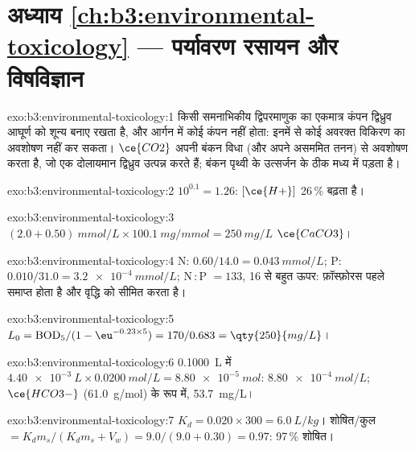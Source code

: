 \section*{अध्याय \ref{ch:b3:environmental-toxicology} --- पर्यावरण रसायन और विषविज्ञान}

\begin{solution}{exo:b3:environmental-toxicology:1}
किसी समनाभिकीय द्विपरमाणुक का एकमात्र कंपन द्विध्रुव आघूर्ण को शून्य बनाए रखता है,
और आर्गन में कोई कंपन नहीं होता: इनमें से कोई अवरक्त विकिरण का अवशोषण नहीं कर सकता। $\ce{CO2}$ अपनी
बंकन विधा (और अपने असममित तनन) से अवशोषण करता है, जो एक दोलायमान
द्विध्रुव उत्पन्न करते हैं; बंकन पृथ्वी के उत्सर्जन के ठीक मध्य में पड़ता है।
\end{solution}

\begin{solution}{exo:b3:environmental-toxicology:2}
$10^{0.1} = 1.26$: $[\ce{H+}]$ 26\,\% बढ़ता है।
\end{solution}

\begin{solution}{exo:b3:environmental-toxicology:3}
$(2.0 + 0.50)\ \unit{mmol/L} \times \qty{100.1}{mg/mmol} = \qty{250}{mg/L}$ $\ce{CaCO3}$।
\end{solution}

\begin{solution}{exo:b3:environmental-toxicology:4}
N: $0.60/14.0 = \qty{0.043}{mmol/L}$; P: $0.010/31.0 = \qty{3.2e-4}{mmol/L}$; N\,:\,P $= 133$, 16 से बहुत ऊपर: फ़ॉस्फ़ोरस पहले
समाप्त होता है और वृद्धि को सीमित करता है।
\end{solution}

\begin{solution}{exo:b3:environmental-toxicology:5}
$L_0 = \mathrm{BOD_5}/(1 - \eu^{-0.23 \times 5}) = 170/0.683 = \qty{250}{mg/L}$।
\end{solution}

\begin{solution}{exo:b3:environmental-toxicology:6}
\qty{0.1000}{L} में $\qty{4.40e-3}{L} \times \qty{0.0200}{mol/L} = \qty{8.80e-5}{mol}$:  $\qty{8.80e-4}{mol/L}$; $\ce{HCO3-}$ (\qty{61.0}{g/mol}) के रूप में,
\qty{53.7}{mg/L}।
\end{solution}

\begin{solution}{exo:b3:environmental-toxicology:7}
$K_d = 0.020 \times 300 = \qty{6.0}{L/kg}$। शोषित/कुल $= K_dm_s/(K_dm_s + V_w) = 9.0/(9.0 + 0.30) = 0.97$: 97\,\% शोषित।
\end{solution}

